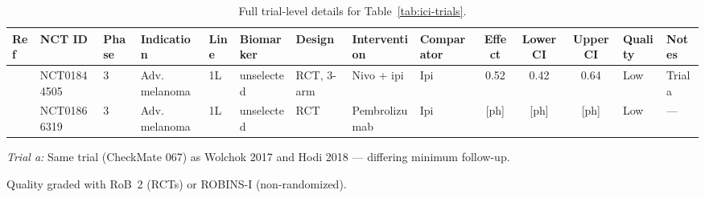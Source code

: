 \begin{table}
  \centering
  \footnotesize
  \begin{threeparttable}
    \caption{Full trial-level details for Table~\ref{tab:ici-trials}.}
    \label{tab:ici-trials-supp}
    \begin{tabular}{@{}lllllllllS[table-format=1.2]S[table-format=1.2]S[table-format=1.2]ll@{}}
      \toprule
      Ref & NCT ID & Phase & Indication & Line & Biomarker & Design & Intervention & Comparator
        & {Effect} & {Lower CI} & {Upper CI} & Quality & Notes \\
      \midrule
      \cite{larkin2019} & NCT01844505 & 3 & Adv. melanoma & 1L & unselected & RCT, 3-arm
        & Nivo + ipi    & Ipi & 0.52  & 0.42  & 0.64  & Low & Trial a \\
      \cite{robert2019} & NCT01866319 & 3 & Adv. melanoma & 1L & unselected & RCT
        & Pembrolizumab & Ipi & {[ph]} & {[ph]} & {[ph]} & Low & --- \\
      \bottomrule
    \end{tabular}
    \begin{tablenotes}[flushleft]
      \footnotesize
      \item \textit{Trial a:} Same trial (CheckMate 067) as Wolchok 2017
            \cite{wolchok2017} and Hodi 2018 \cite{hodi2018} --- differing
            minimum follow-up.
      \item Quality graded with RoB~2 (RCTs) or ROBINS-I (non-randomized).
    \end{tablenotes}
  \end{threeparttable}
\end{table}

